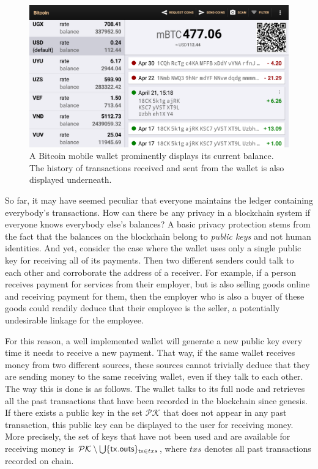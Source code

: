 \begin{figure}[h]
  \centering
  \includegraphics[width=0.9 \columnwidth,keepaspectratio]{figures/wallet-balance.png}
  \caption{A Bitcoin mobile wallet prominently displays its current balance. The history of transactions
           received and sent from the wallet is also displayed underneath.}
  \label{fig.wallet-balance}
\end{figure}

So far, it may have seemed peculiar that everyone maintains the ledger containing everybody's transactions.
How can there be any privacy in a blockchain system if everyone knows everybody else's balances? A basic
privacy protection stems from the fact that the balances on the blockchain belong to \emph{public keys}
and not human identities. And yet, consider the case where the wallet uses only a single public key for
receiving all of its payments. Then two different senders could talk to each other and corroborate the
address of a receiver. For example, if a person receives payment for services from their employer, but is
also selling goods online and receiving payment for them, then the employer who is also a buyer of these
goods could readily deduce that their employee is the seller, a potentially undesirable linkage for the
employee.

For this reason, a well implemented wallet will generate a new public key
every time it needs to receive a new payment. That way, if the same wallet receives money from two different
sources, these sources cannot trivially deduce that they are sending money to the same receiving wallet, even
if they talk to each other. The way this is done is as follows. The wallet talks to its full node and retrieves
all the past transactions that have been recorded in the blockchain since genesis. If there exists a public key in the set
$\mathcal{PK}$ that does not appear in any past transaction, this public key can be displayed to the user for
receiving money. More precisely, the set of keys that have not been used and are available for receiving money
is $\mathcal{PK} \setminus \bigcup \{ \mathsf{tx}\textsf{.outs} \}_{\mathsf{tx} \in txs}$, where $txs$ denotes all past transactions
recorded on chain.

